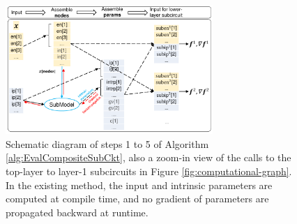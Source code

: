 \begin{figure}[htpb]
\centering
\includegraphics[width=0.7\textwidth]{fig/EvalCompositeSubCkt.pdf}
\caption{Schematic diagram of steps 1 to 5 of Algorithm \ref{alg:EvalCompositeSubCkt}, also a zoom-in view of the calls to the top-layer to layer-1 subcircuits in Figure \ref{fig:computational-graph}. In the existing method, the input and intrinsic parameters are computed at compile time, and no gradient of parameters are propagated backward at runtime.}
\label{fig:EvalCompositeSubCkt}
\end{figure}

